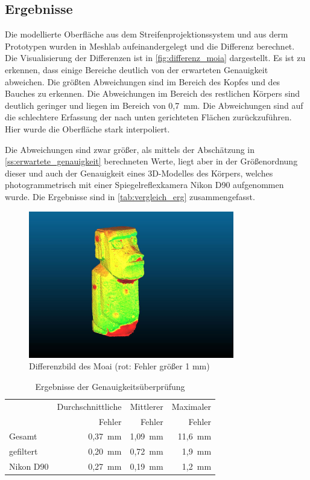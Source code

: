 \documentclass[./00PhotoBox.tex]{subfiles}
\begin{document}
\subsection{Ergebnisse}
Die modellierte Oberfläche aus dem Streifenprojektionssystem und aus derm Prototypen wurden in Meshlab aufeinandergelegt und die Differenz berechnet. Die Visualisierung der Differenzen ist in \autoref{fig:differenz_moia} dargestellt. Es ist zu erkennen, dass einige Bereiche deutlich von der erwarteten Genauigkeit abweichen. Die größten Abweichungen sind im Bereich des Kopfes und des Bauches zu erkennen. Die Abweichungen im Bereich des restlichen Körpers sind deutlich geringer und liegen im Bereich von 0,7~mm. Die Abweichungen sind auf die schlechtere Erfassung der nach unten gerichteten Flächen  zurückzuführen. Hier wurde die Oberfläche stark interpoliert.

Die Abweichungen sind zwar größer, als mittels der Abschätzung in \autoref{ss:erwartete_genauigkeit} berechneten Werte, liegt aber in der Größenordnung dieser und auch der Genauigkeit eines 3D-Modelles des Körpers, welches photogrammetrisch mit einer Spiegelreflexkamera Nikon D90 aufgenommen wurde. Die Ergebnisse sind in \autoref{tab:vergleich_erg} zusammengefasst.

\begin{figure}
    \centering
    \includegraphics[width=0.8\textwidth]{img/moai_fehler.jpg}
    \caption{Differenzbild des Moai (rot: Fehler größer 1 mm)}
    \label{fig:differenz_moia}
\end{figure}

\begin{table}
    \centering
    \caption{Ergebnisse der Genauigkeitsüberprüfung}
    \label{tab:vergleich_erg}
    \begin{tabular}{l|r|r|r}
        \toprule
                  & Durchschnittliche & Mittlerer & Maximaler \\
                  & Fehler            & Fehler    & Fehler    \\
        \midrule
        Gesamt    & 0,37~mm           & 1,09~mm   & 11,6~mm   \\
        gefiltert & 0,20~mm           & 0,72~mm   & 1,9~mm    \\
        \midrule
        Nikon D90 & 0,27~mm           & 0,19~mm   & 1,2~mm    \\
        \bottomrule
    \end{tabular}
\end{table}
\end{document}
